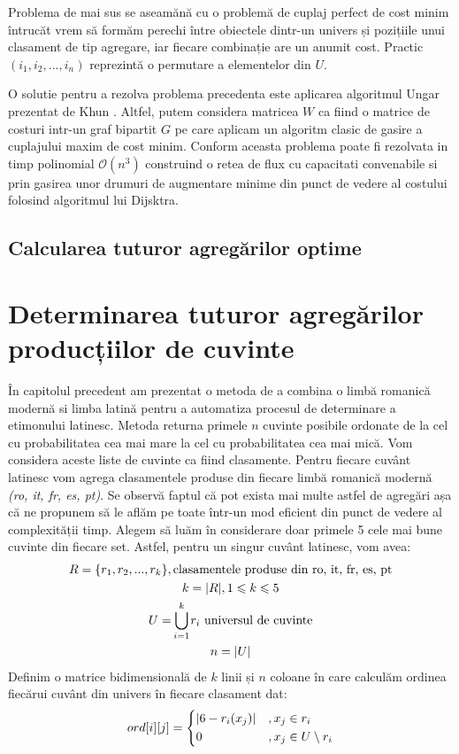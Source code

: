 Problema de mai sus se aseamănă cu o problemă de cuplaj perfect de cost minim întrucăt vrem să formăm
perechi între obiectele dintr-un univers și pozițiile unui clasament de tip agregare, iar fiecare
combinație are un anumit cost. Practic $(i_1, i_2, ..., i_n)$ reprezintă o permutare a elementelor
din $U$.

O solutie pentru a rezolva problema precedenta este aplicarea algoritmul Ungar prezentat de Khun \cite{hungarianmethod}.
Altfel, putem considera matricea $W$ ca fiind o matrice de costuri intr-un graf bipartit $G$ pe care
aplicam un algoritm clasic de gasire a cuplajului maxim de cost minim. Conform \cite{flowassignment}
aceasta problema poate fi rezolvata in timp polinomial $\mathcal{O}(n^3)$ construind o retea de flux
cu capacitati convenabile si prin gasirea unor drumuri de augmentare minime din punct de vedere
al costului folosind algoritmul lui Dijsktra\cite{dijkstra}.


\subsection{Calcularea tuturor agregărilor optime}



\section{Determinarea tuturor agregărilor producțiilor de cuvinte}
În capitolul precedent am prezentat o metoda de a combina o limbă romanică modernă si limba latină
pentru a automatiza procesul de determinare a etimonului latinesc. Metoda returna primele $n$
cuvinte posibile ordonate de la cel cu probabilitatea cea mai mare la cel cu probabilitatea cea mai
mică. Vom considera aceste liste de cuvinte ca fiind clasamente. Pentru fiecare cuvânt latinesc vom
agrega clasamentele produse din fiecare limbă romanică modernă \textit{(ro, it, fr, es, pt)}.
Se observă faptul că pot exista mai multe astfel de agregări așa că ne propunem să le aflăm pe toate
într-un mod eficient din punct de vedere al complexității timp. Alegem să luăm în considerare
doar primele 5 cele mai bune cuvinte din fiecare set. Astfel, pentru un singur cuvânt latinesc, vom 
avea:
\begin{gather*}
  R = \{r_1, r_2, ..., r_k\}, \text{clasamentele produse din ro, it, fr, es, pt} \\
  k = |R|, 1 \leqslant k \leqslant 5 \\
  U = \smashoperator{\bigcup_{i = 1}^{k}} r_i \text{ universul de cuvinte} \\
  n = |U|
\end{gather*}
Definim o matrice bidimensională de $k$ linii și $n$ coloane în care calculăm ordinea fiecărui 
cuvânt din univers în fiecare clasament dat:
\[
  ord[i][j] = \begin{dcases}
    |6 - r_i(x_j)|    &, x_j \in r_i \\
    0                 &, x_j \in U \setminus r_i 
  \end{dcases}
\]
